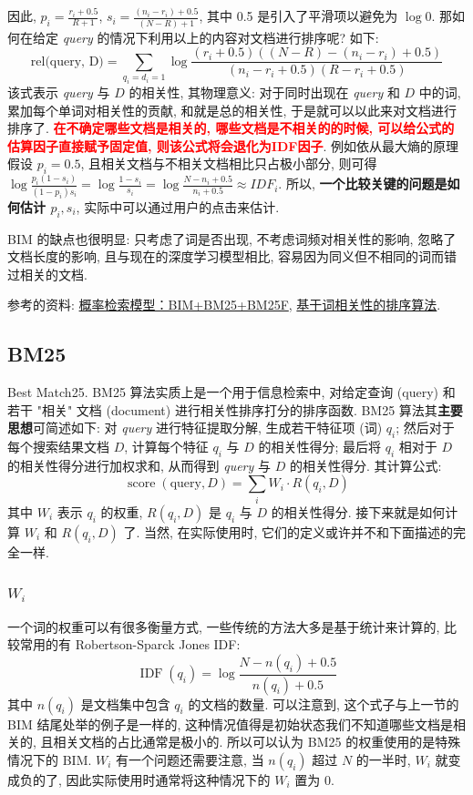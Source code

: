 因此, $p_i = \frac{r_i + 0.5}{R+1}$, $s_i = \frac{(n_i - r_i) + 0.5 }{(N - R) + 1}$, 其中 0.5 是引入了平滑项以避免为 $\log 0$. 那如何在给定 \textit{query} 的情况下利用以上的内容对文档进行排序呢? 如下:
$$
\text{rel(query, D)} = \sum_{q_{i}=d_{i}=1} \log \frac{\left(r_{i}+0.5\right)\left((N-R)-\left(n_{i}-r_{i}\right)+0.5\right)}{\left(n_{i}-r_{i}+0.5\right)\left(R-r_{i}+0.5\right)}
$$
该式表示 \textit{query} 与 $D$ 的相关性, 其物理意义: 对于同时出现在 \textit{query} 和 $D$ 中的词, 累加每个单词对相关性的贡献, 和就是总的相关性, 于是就可以以此来对文档进行排序了. \textbf{\textcolor{red}{在不确定哪些文档是相关的, 哪些文档是不相关的的时候, 可以给公式的估算因子直接赋予固定值, 则该公式将会退化为IDF因子}}. 例如依从最大熵的原理假设 $p_i = 0.5$, 且相关文档与不相关文档相比只占极小部分, 则可得 $\log \frac{p_i (1 - s_i)}{(1 - p_i) s_i} = \log \frac{1 - s_i}{s_i} = \log \frac{N - n_i + 0.5}{n_i + 0.5} \approx IDF_i$. 所以, \textbf{一个比较关键的问题是如何估计 $p_i, s_i$}, 实际中可以通过用户的点击来估计.

BIM 的缺点也很明显: 只考虑了词是否出现, 不考虑词频对相关性的影响, 忽略了文档长度的影响, 且与现在的深度学习模型相比, 容易因为同义但不相同的词而错过相关的文档.

参考的资料: \href{https://www.cnblogs.com/bentuwuying/p/6730891.html}{概率检索模型：BIM+BM25+BM25F}, \href{https://blog.csdn.net/SrdLaplace/article/details/84954920}{基于词相关性的排序算法}.

\subsection{BM25}
Best Match25. BM25 算法实质上是一个用于信息检索中, 对给定查询 (query) 和若干 "相关" 文档 (document) 进行相关性排序打分的排序函数. BM25 算法其\textbf{主要思想}可简述如下: 对 \textit{query} 进行特征提取分解, 生成若干特征项 (词) $q_i$; 然后对于每个搜索结果文档 $D$, 计算每个特征 $q_i$ 与 $D$ 的相关性得分; 最后将 $q_i$ 相对于 $D$ 的相关性得分进行加权求和, 从而得到 \textit{query} 与 $D$ 的相关性得分. 其计算公式:
$$
\operatorname{score}(\text{query}, D)=\sum_{i} W_{i} \cdot R\left(q_{i}, D\right)
$$
其中 $W_i$ 表示 $q_i$ 的权重, $R(q_i, D)$ 是 $q_i$ 与 $D$ 的相关性得分. 接下来就是如何计算 $W_i$ 和 $R(q_i, D)$ 了. 当然, 在实际使用时, 它们的定义或许并不和下面描述的完全一样.

\subsubsection{$W_i$}
一个词的权重可以有很多衡量方式, 一些传统的方法大多是基于统计来计算的, 比较常用的有 Robertson-Sparck Jones IDF:
$$
\operatorname{IDF}\left(q_{i}\right)=\log \frac{N-n\left(q_{i}\right)+0.5}{n\left(q_{i}\right)+0.5}
$$
其中 $n(q_i)$ 是文档集中包含 $q_i$ 的文档的数量. 可以注意到, 这个式子与上一节的 BIM 结尾处举的例子是一样的, 这种情况值得是初始状态我们不知道哪些文档是相关的, 且相关文档的占比通常是极小的. 所以可以认为 BM25 的权重使用的是特殊情况下的 BIM. $W_i$ 有一个问题还需要注意, 当 $n(q_i)$ 超过 $N$ 的一半时, $W_i$ 就变成负的了, 因此实际使用时通常将这种情况下的 $W_i$ 置为 0.

